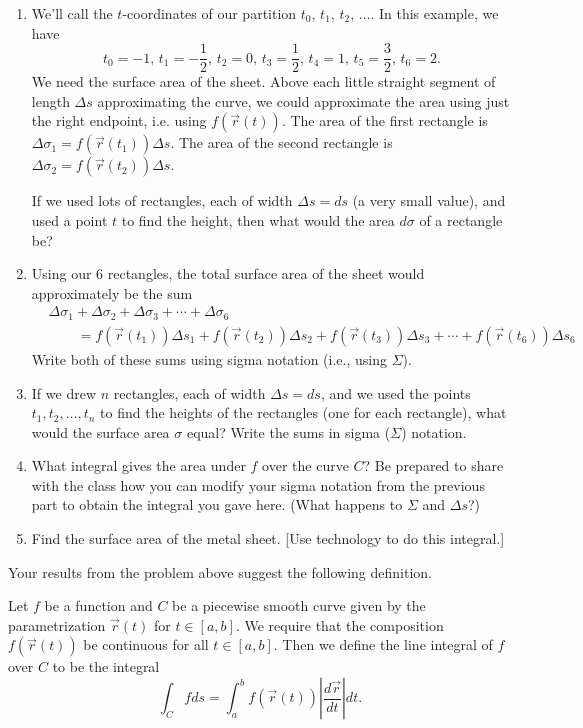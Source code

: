 \begin{problem}
\begin{enumerate}
 \item We'll call the $t$-coordinates of our partition $t_0$, $t_1$, $t_2$, $\ldots$. In this example, we have 
$$
t_0=-1, \,
t_1=-\frac{1}{2},  \,
t_2=0,  \,
t_3=\frac{1}{2},  \,
t_4=1,  \,
t_5=\frac{3}{2},  \,
t_6=2.
$$
We need the surface area of the sheet. Above each little straight segment of length $\Delta s$ approximating the curve, we could approximate the area using just the right endpoint, i.e. using $f(\vec r(t))$.  The area of the first rectangle is   $\Delta \sigma_1=f(\vec r(t_1))\Delta s$. The area of the second rectangle is $\Delta \sigma_2=f(\vec r(t_2))\Delta s$.  

If we used lots of rectangles, each of width $\Delta s = ds$ (a very small value), and used a point $t$ to find the height, then what would the area $d\sigma$ of a rectangle be?

\item Using our 6 rectangles, the total surface area of the sheet would approximately be the sum
\begin{equation*}
\begin{split}
&\Delta \sigma_1 + \Delta \sigma_2 + \Delta \sigma_3 + \cdots + \Delta \sigma_6\\
& \qquad =
f(\vec r(t_1))\Delta s_1+
f(\vec r(t_2))\Delta s_2+
f(\vec r(t_3))\Delta s_3+\cdots+
f(\vec r(t_6))\Delta s_6
\end{split}
\end{equation*}
Write both of these sums using sigma notation (i.e., using $\Sigma$).

\item If we drew $n$ rectangles, each of width $\Delta s=ds$, and we used the points $t_1,t_2,\ldots,t_n$ to find the heights of the rectangles (one for each rectangle), what would the surface area $\sigma$ equal?  Write the sums in sigma ($\Sigma$) notation.


\item What integral gives the area under $f$ over the curve $C$? Be prepared to share with the class how you can modify your sigma notation from the previous part to obtain the integral you gave here. (What happens to $\Sigma$ and $\Delta s$?)
\item Find the surface area of the metal sheet. [Use technology to do this integral.]
\end{enumerate}
\end{problem}

Your results from the problem above suggest the following definition.
\begin{definition}%
 Let $f$ be a function and $C$ be a piecewise smooth curve given by the parametrization $\vec r(t)$ for $t\in[a,b]$. We require that the composition $f(\vec r(t))$ be continuous for all $t\in [a,b]$. Then we define the line integral
of $f$ over $C$ to be the integral 
$$\int_C f ds = \int_a^b f(\vec r(t))\left|\frac{d\vec r}{dt}\right|dt.$$
\end{definition}

